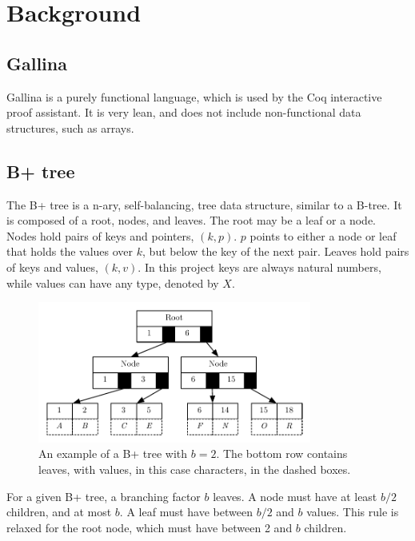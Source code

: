 \section{Background}
\label{sec:Background}

\subsection{Gallina}
Gallina is a purely functional language, which is used by the Coq interactive proof assistant. It is very lean, and does not include non-functional data structures, such as arrays.

\subsection{B+ tree}
The B+ tree is a n-ary, self-balancing, tree data structure, similar to a B-tree. It is composed of a root, nodes, and leaves. The root may be a leaf or a node. Nodes hold pairs of keys and pointers, $(k, p)$. $p$ points to either a node or leaf that holds the values over $k$, but below the key of the next pair. Leaves hold pairs of keys and values, $(k, v)$. In this project keys are always natural numbers, while values can have any type, denoted by $X$. 

\begin{figure}
 \centering
   \includegraphics[width=90mm]{diagrams/BPlusTree.pdf}
 \caption{An example of a B+ tree with $b=2$. The bottom row contains leaves, with values, in this case characters, in the dashed boxes.}
 \label{fig:bplustree}
\end{figure}

For a given B+ tree, a branching factor $b$
leaves. A node must have at least $b/2$ children, and at most $b$. A
leaf must have between $b/2$ and $b$ values. This rule is relaxed for the root
node, which must have between 2 and $b$ children. 

